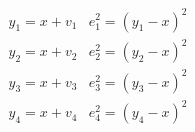 \documentclass{article}
\begin{document}
\begin{equation}
\begin{array}{ll}{y_{1}=x+v_{1}} & {e_{1}^{2}=\left(y_{1}-x\right)^{2}} \\ {y_{2}=x+v_{2}} & {e_{2}^{2}=\left(y_{2}-x\right)^{2}} \\ {y_{3}=x+v_{3}} & {e_{3}^{2}=\left(y_{3}-x\right)^{2}} \\ {y_{4}=x+v_{4}} & {e_{4}^{2}=\left(y_{4}-x\right)^{2}}
\end{array}
\end{equation}
\end{document}
